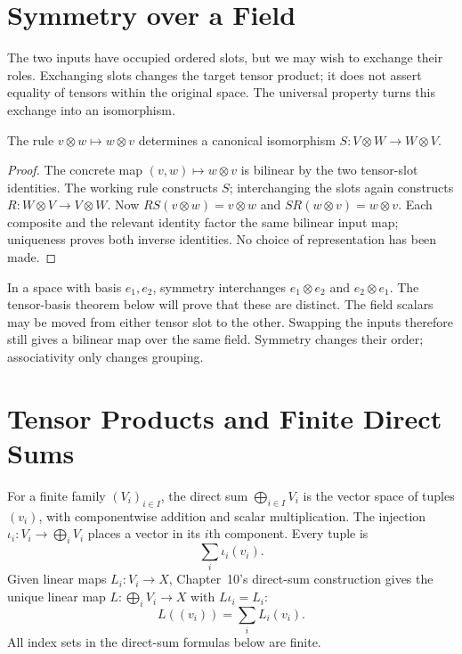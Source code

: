 \section{Symmetry over a Field}

The two inputs have occupied ordered slots, but we may wish to exchange
their roles. Exchanging slots changes the target tensor product; it does
not assert equality of tensors within the original space. The universal
property turns this exchange into an isomorphism.

\begin{proposition}[Symmetry]
The rule $v\otimes w\mapsto w\otimes v$ determines a canonical isomorphism
$S:V\otimes W\to W\otimes V$.
\end{proposition}
\begin{proof}
The concrete map $(v,w)\mapsto w\otimes v$ is bilinear by the two
tensor-slot identities. The working rule constructs $S$; interchanging
the slots again constructs $R:W\otimes V\to V\otimes W$.
Now $RS(v\otimes w)=v\otimes w$ and $SR(w\otimes v)=w\otimes v$.
Each composite and the relevant identity factor the same bilinear input
map; uniqueness proves both inverse identities. No choice of representation has been made.
\end{proof}

In a space with basis $e_1,e_2$, symmetry interchanges $e_1\otimes e_2$ and $e_2\otimes e_1$.
The tensor-basis theorem below will prove that these are distinct.
The field scalars may be moved from either tensor slot to the other.
Swapping the inputs therefore still gives a bilinear map over the same
field. Symmetry changes their order; associativity only changes grouping.

\section{Tensor Products and Finite Direct Sums}
\label{sec:tensor-direct-sums}
For a finite family $(V_i)_{i\in I}$, the direct sum
$\bigoplus_{i\in I}V_i$ is the vector space of tuples $(v_i)$, with
componentwise addition and scalar multiplication. The injection
$\iota_i:V_i\to\bigoplus_i V_i$ places a vector in its $i$th component.
Every tuple is
\[
\sum_i\iota_i(v_i).
\]
 Given linear maps $L_i:V_i\to X$,
Chapter~10's direct-sum construction gives the unique linear map
$L:\bigoplus_iV_i\to X$ with $L\iota_i=L_i$:
\[
L((v_i))=\sum_i L_i(v_i).
\]
All index sets in the direct-sum formulas below are finite.


